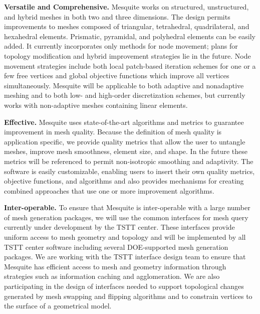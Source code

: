 \documentclass[letter]{report}
\begin{document}
{\bf Versatile and Comprehensive.}  Mesquite works on structured,
unstructured, and hybrid meshes in both two and three dimensions. The
design permits improvements to meshes composed of triangular,
tetrahedral, quadrilateral, and hexahedral elements. Prismatic,
pyramidal, and polyhedral elements can be easily added.  
It currently incorporates only methods for node movement; plans for 
topology modification and hybrid improvement strategies lie in the future.
Node movement strategies include both local patch-based iteration
schemes for one or a few free vertices and global objective functions
which improve all vertices simultaneously.  Mesquite will be
applicable to both adaptive and nonadaptive meshing and to both low-
and high-order discretization schemes, but currently works with
non-adaptive meshes containing linear elements.

{\bf Effective.}  Mesquite uses state-of-the-art algorithms and
metrics to guarantee improvement in mesh quality.  Because the
definition of mesh quality is application specific, we provide quality
metrics that allow the user to untangle meshes, improve mesh
smoothness, element size, and shape. In the future these metrics will
be referenced to permit non-isotropic smoothing and adaptivity. The
software is easily customizable, enabling users to insert their own
quality metrics, objective functions, and algorithms and also provides
mechanisms for creating combined approaches that use one or more
improvement algorithms.

{\bf Inter-operable.}  To ensure that Mesquite is inter-operable with a
large number of mesh generation packages, we will use the common
interfaces for mesh query currently under development by the TSTT
center.  These interfaces provide uniform access to mesh geometry and
topology and will be implemented by all TSTT center software including
several DOE-supported mesh generation packages.  We are working with
the TSTT interface design team to ensure that Mesquite has efficient
access to mesh and geometry information through strategies such as
information caching and agglomeration.  We are also participating in
the design of interfaces needed to support topological changes
generated by mesh swapping and flipping algorithms and to constrain
vertices to the surface of a geometrical model.

\end{document}
